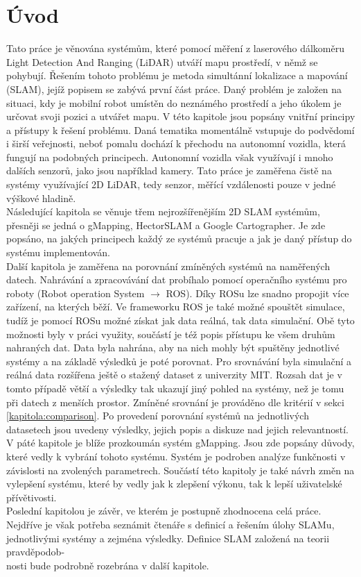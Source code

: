 \documentclass[12pt]{report}
\begin{document}
\chapter{Úvod}
Tato práce je věnována systémům, které pomocí měření z laserového dálkoměru Light Detection And Ranging (LiDAR) utváří mapu prostředí, v němž se pohybují. Řešením tohoto problému je metoda simultánní lokalizace a mapování (SLAM), jejíž popisem se zabývá první část práce. Daný problém je založen na situaci, kdy je mobilní robot umístěn do neznámého prostředí a jeho úkolem je určovat svoji pozici a utvářet mapu. V této kapitole jsou popsány vnitřní principy a přístupy k řešení problému. Daná tematika momentálně vstupuje do podvědomí i širší veřejnosti, neboť pomalu dochází k přechodu na autonomní vozidla, která fungují na podobných principech. Autonomní vozidla však využívají i mnoho dalších senzorů, jako jsou například kamery. Tato práce je zaměřena čistě na systémy využívající 2D LiDAR, tedy senzor, měřící vzdálenosti pouze v jedné výškové hladině.\\
\indent Následující kapitola se věnuje třem nejrozšířenějším 2D SLAM systémům, přesněji se jedná o gMapping, HectorSLAM a Google Cartographer. Je zde popsáno, na jakých principech každý ze systémů pracuje a jak je daný přístup do systému implementován. \\
\indent Další kapitola je zaměřena na porovnání zmíněných systémů na naměřených datech. Nahrávání a zpracovávání dat probíhalo pomocí operačního systému pro roboty (Robot operation System $\rightarrow$ ROS). Díky ROSu lze snadno propojit více zařízení, na kterých běží. Ve frameworku ROS je také možné spouštět simulace, tudíž je pomocí ROSu možné získat jak data reálná, tak data simulační. Obě tyto možnosti byly v práci využity, součástí je též popis přístupu ke všem druhům nahraných dat. Data byla nahrána, aby na nich mohly být spuštěny jednotlivé systémy a na základě výsledků je poté porovnat. Pro srovnávání byla simulační a reálná data rozšířena ještě o stažený dataset z univerzity MIT. Rozsah dat je v tomto případě větší a výsledky tak ukazují jiný pohled na systémy, než je tomu při datech z menších prostor. Zmíněné srovnání je prováděno dle kritérií v sekci \ref{kapitola:comparison}. Po provedení porovnání systémů na jednotlivých datasetech jsou uvedeny výsledky, jejich popis a diskuze nad jejich relevantností. \\
\indent V páté kapitole je blíže prozkoumán systém gMapping. Jsou zde popsány důvody, které vedly k vybrání tohoto systému. Systém je podroben analýze funkčnosti v závislosti na zvolených parametrech. Součástí této kapitoly je také návrh změn na vylepšení systému, které by vedly jak k zlepšení výkonu, tak k lepší uživatelské přívětivosti. \\
\indent Poslední kapitolou je závěr, ve kterém je postupně zhodnocena celá práce. Nejdříve je však potřeba seznámit čtenáře s definicí a řešením úlohy SLAMu, jednotlivými systémy a zejména výsledky. Definice SLAM založená na teorii pravděpodob-\\nosti bude podrobně rozebrána v další kapitole.
\newpage
\end{document}
